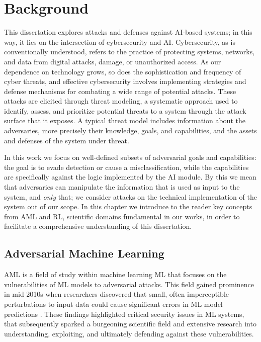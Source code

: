 \chapter{Background}\label{ch:background}

This dissertation explores attacks and defenses against AI-based systems; in this way, it lies on the intersection of cybersecurity and AI.
Cybersecurity, as is conventionally understood, refers to the practice of protecting systems, networks, and data from digital attacks, damage, or unauthorized access.
As our dependence on technology grows, so does the sophistication and frequency of cyber threats, and effective cybersecurity involves implementing strategies and defense mechanisms for combating a wide range of potential attacks.
These attacks are elicited through threat modeling, a systematic approach used to identify, assess, and prioritize potential threats to a system through the attack surface that it exposes.
A typical threat model includes information about the adversaries, more precisely their knowledge, goals, and capabilities, and the assets and defenses of the system under threat.

In this work we focus on well-defined subsets of adversarial goals and capabilities: the goal is to evade detection or cause a misclassification, while the capabilities are specifically against the logic implemented by the AI module.
By this we mean that adversaries can manipulate the information that is used as input to the system, and \textit{only} that; we consider attacks on the technical implementation of the system out of our scope.
In this chapter we introduce to the reader key concepts from \gls{AML} and \gls{RL}, scientific domains fundamental in our works, in order to facilitate a comprehensive understanding of this dissertation.

\section{Adversarial Machine Learning}
\gls{AML} is a field of study within machine learning \gls{ML} that focuses on the vulnerabilities of \gls{ML} models to adversarial attacks.
This field gained prominence in mid 2010s when researchers discovered that small, often imperceptible perturbations to input data could cause significant errors in ML model predictions \cite{biggio2013evasion, szegedy2013intriguing}.
These findings highlighted critical security issues in ML systems, that subsequently sparked a burgeoning scientific field and extensive research into understanding, exploiting, and ultimately defending against these vulnerabilities.

